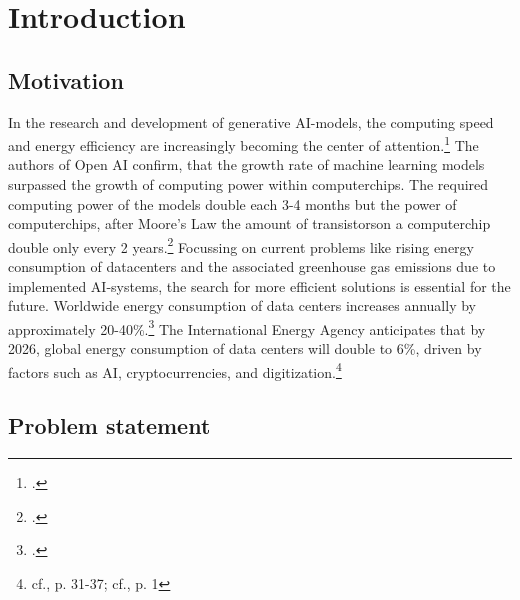 \chapter{Introduction}


\section{Motivation}

In the research and development of generative AI-models, the computing speed and energy efficiency
are increasingly becoming the center of attention.\footcite[cf.][1]{luccioniPowerHungryProcessing2023}
The authors of Open AI confirm, that the growth rate of machine learning models 
surpassed the growth of computing power within computerchips.
The required computing power of the models double each 3-4 months but the power of computerchips, after Moore’s Law 
the amount of transistorson a computerchip double only every 2 years.\footcite[cf.][1]{darioamodeiAICompute}
Focussing on current problems like rising energy consumption of datacenters and the associated
greenhouse gas emissions due to implemented AI-systems, the search for more efficient solutions is essential for the future.
Worldwide energy consumption of data centers increases annually by approximately 20-40\%.\footcite[cf.][1]{hintemannDataCenters20212022} 
The International Energy Agency anticipates that by 2026, global energy consumption of data centers will double to 6\%, driven by factors such as AI, cryptocurrencies, and digitization.\footnote{cf.\cite{anon.Electricity2024Analysis2024}, p. 31-37; cf.\cite{jacksonAIBoomWill2024}, p. 1}

\section{Problem statement}

